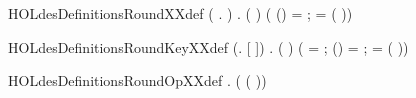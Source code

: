 \newcommand{\HOLdesDefinitionsRXXdata}{\UseVerbatim{HOLdesDefinitionsRXXdata}}
\begin{SaveVerbatim}{HOLdesDefinitionsRoundXXdef}
\HOLTokenTurnstile{} (\HOLSymConst{\HOLTokenForall{}} .     \HOLSymConst{=} ) \HOLSymConst{\HOLTokenConj{}}
   \HOLSymConst{\HOLTokenForall{}}  .
      ( )   \HOLSymConst{=}
     (
        (\HOLSymConst{,}) =    ;
         =   
        (\HOLSymConst{,} \HOLSymConst{\HOLTokenEor{}}   ))
\end{SaveVerbatim}
\newcommand{\HOLdesDefinitionsRoundXXdef}{\UseVerbatim{HOLdesDefinitionsRoundXXdef}}
\begin{SaveVerbatim}{HOLdesDefinitionsRoundKeyXXdef}
\HOLTokenTurnstile{} (\HOLSymConst{\HOLTokenForall{}}.    \HOLSymConst{=} [ ]) \HOLSymConst{\HOLTokenConj{}}
   \HOLSymConst{\HOLTokenForall{}} .
      ( )  \HOLSymConst{=}
     (
         =   ;
        (\HOLSymConst{,}) =  ;
         =   
        ( \HOLSymConst{\HOLTokenRol{}} \HOLSymConst{,} \HOLSymConst{\HOLTokenRol{}} )\HOLSymConst{::})
\end{SaveVerbatim}
\newcommand{\HOLdesDefinitionsRoundKeyXXdef}{\UseVerbatim{HOLdesDefinitionsRoundKeyXXdef}}
\begin{SaveVerbatim}{HOLdesDefinitionsRoundOpXXdef}
\HOLTokenTurnstile{} \HOLSymConst{\HOLTokenForall{}} .    \HOLSymConst{=}  ( (  \HOLSymConst{\HOLTokenEor{}} ))
\end{SaveVerbatim}
\newcommand{\HOLdesDefinitionsRoundOpXXdef}{\UseVerbatim{HOLdesDefinitionsRoundOpXXdef}}
